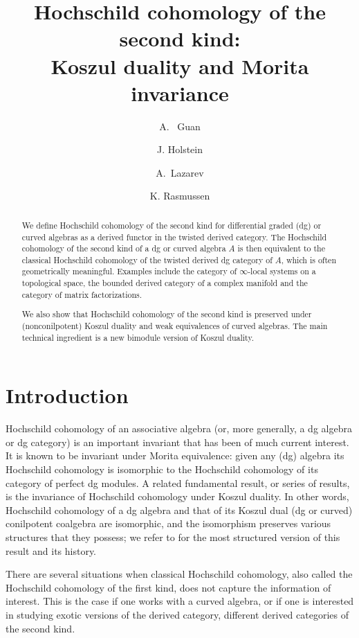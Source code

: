 \documentclass[a4paper]{amsart}
\title[Hochschild cohomology of the second kind]{Hochschild cohomology of the second kind:\\ Koszul duality and Morita invariance}
\author{A. ~Guan}
\author{J. Holstein}
\author{A.~Lazarev}
\author{K. Rasmussen}
\theoremstyle{plain}
\theoremstyle{definition}
\theoremstyle{remark}
\numberwithin{equation}{section}
\theoremstyle{plain}
\begin{document}
	
	
	\begin{abstract}
		We define Hochschild cohomology of the  second kind for differential graded (dg) or curved algebras as a derived functor in the twisted derived category.
		The Hochschild cohomology of the second kind of a dg or curved algebra $A$	is then equivalent to the classical Hochschild cohomology of the twisted derived dg category of $A$, which is often geometrically meaningful.
		Examples include the category of $\infty$-local systems on a topological space, the bounded derived category of a complex manifold and the category of matrix factorizations. 
		
		We also show that Hochschild cohomology of the second kind is preserved under (nonconilpotent) Koszul duality and weak equivalences of curved algebras.
		The main technical ingredient is a new bimodule version of Koszul duality.
	\end{abstract}
	
	\maketitle
	
	\tableofcontents
	
	\section{Introduction}
	Hochschild cohomology of an associative algebra (or, more generally, a dg algebra or dg category) is an important invariant that has been of much current interest. %
	It is known to be invariant under Morita equivalence: given any (dg) algebra its Hochschild cohomology is isomorphic to the Hochschild cohomology of its category of perfect dg modules. 
	A related fundamental result, or series of results, is the invariance of Hochschild cohomology under Koszul duality. In other words, Hochschild cohomology of a dg algebra and that of its Koszul dual (dg or curved) conilpotent coalgebra are isomorphic, and the isomorphism preserves various structures that they possess; we refer to \cite{kel21a} for the most structured version of this result and its history. 
	
	There are several situations when classical Hochschild cohomology, also called the Hochschild cohomology of the first kind, does not capture the information of interest.
	This is the case if one works with a curved algebra, or if one is interested in studying exotic versions of the derived category, different derived categories of the second kind.
	
\end{document}
